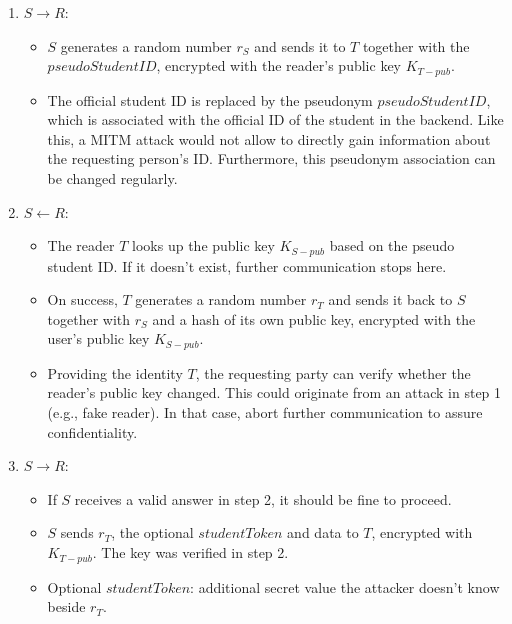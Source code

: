 \begin{enumerate}
	\item $ S \rightarrow R $:
	\begin{itemize}
		\item $ S $ generates a random number $ r_S $ and sends it to $ T $ together with the $ pseudoStudentID $, encrypted with the reader's public key $ K_{T-pub} $.
		\item The official student ID is replaced by the pseudonym $ pseudoStudentID $, which is associated with the official ID of the student in the backend.
		Like this, a MITM attack would not allow to directly gain information about the requesting person's ID.
		Furthermore, this pseudonym association can be changed regularly.
	\end{itemize}	
	\item $ S \leftarrow R $:
	\begin{itemize}
		\item The reader $ T $ looks up the public key $ K_{S-pub} $ based on the pseudo student ID. If it doesn't exist, further communication stops here.
		\item On success, $ T $ generates a random number $ r_T $ and sends it back to $ S $ together with $ r_S $ and a hash of its own public key, encrypted with the user's public key $ K_{S-pub} $.
		\item Providing the identity $ T $, the requesting party can verify whether the reader's public key changed. This could originate from an attack in step 1 (e.g., fake reader). In that case, abort further communication to assure confidentiality.
	\end{itemize}	
	\item $ S \rightarrow R $:
	\begin{itemize}
		\item If $ S $ receives a valid answer in step 2, it should be fine to proceed.
		\item $ S $ sends $ r_T $, the optional $ studentToken $ and data to $ T $, encrypted with $ K_{T-pub} $. The key was verified in step 2.
		\item Optional $ studentToken $: additional secret value the attacker doesn't know beside $ r_T $.
	\end{itemize}
\end{enumerate}


